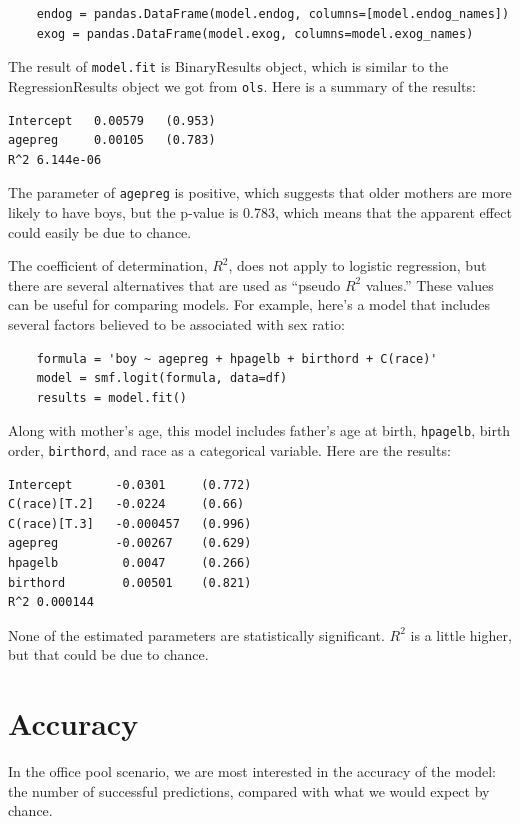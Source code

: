 \documentclass[12pt]{book}
\begin{document}
\begin{verbatim}
    endog = pandas.DataFrame(model.endog, columns=[model.endog_names])
    exog = pandas.DataFrame(model.exog, columns=model.exog_names)
\end{verbatim}

The result of {\tt model.fit} is BinaryResults object, which is
similar to the RegressionResults object we got from {\tt ols}.
Here is a summary of the results:

\begin{verbatim}
Intercept   0.00579   (0.953)
agepreg     0.00105   (0.783)
R^2 6.144e-06
\end{verbatim}

The parameter of {\tt agepreg} is positive, which suggests that
older mothers are more likely to have boys, but the p-value is
0.783, which means that the apparent effect could easily be due
to chance.

The coefficient of determination, $R^2$, does not apply to logistic
regression, but there are several alternatives that are used
as ``pseudo $R^2$ values.''  These values can be useful for comparing
models.  For example, here's a model that includes several factors
believed to be associated with sex ratio:

\begin{verbatim}
    formula = 'boy ~ agepreg + hpagelb + birthord + C(race)'
    model = smf.logit(formula, data=df)
    results = model.fit()
\end{verbatim}

Along with mother's age, this model includes father's age at
birth, {\tt hpagelb}, birth order, {\tt birthord}, and
race as a categorical variable.  Here are the results:

\begin{verbatim}
Intercept      -0.0301     (0.772)
C(race)[T.2]   -0.0224     (0.66)
C(race)[T.3]   -0.000457   (0.996)
agepreg        -0.00267    (0.629)
hpagelb         0.0047     (0.266)
birthord        0.00501    (0.821)
R^2 0.000144
\end{verbatim}

None of the estimated parameters are statistically significant.
$R^2$ is a little higher, but that could be due to chance.


\section{Accuracy}
\label{accuracy}

In the office pool scenario,
we are most interested in the accuracy of the model:
the number of successful predictions, compared with what we would
expect by chance.
\end{document}
